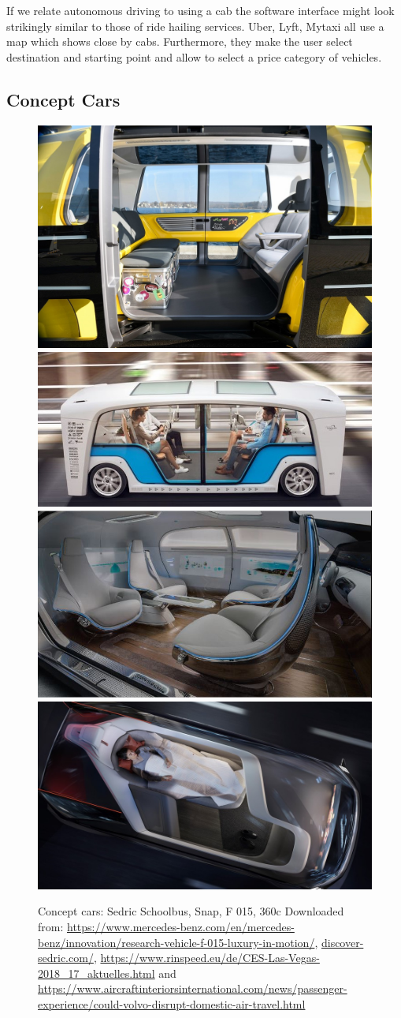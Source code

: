 If we relate autonomous driving to using a cab the software interface might look strikingly similar to those of ride hailing services. Uber, Lyft, Mytaxi all use a map which shows close by cabs. Furthermore, they make the user select destination and starting point and allow to select a price category of vehicles.  

\subsection{Concept Cars}
\label{sec:conceptcars}
\begin{figure}
    \includegraphics[height=0.27\textwidth]{fig/school_bus_Mittel.jpg}\hfill\includegraphics[height=0.27\textwidth]{fig/snap.jpg}\newline\includegraphics[height=0.276\textwidth]{fig/mercedes.JPG}\hfill\includegraphics[height=0.276\textwidth]{fig/360c_Mittel.jpg}
    \caption[Concept Cars]{Concept cars: Sedric Schoolbus, Snap, F 015, 360c Downloaded from: \url{https://www.mercedes-benz.com/en/mercedes-benz/innovation/research-vehicle-f-015-luxury-in-motion/}, \url{discover-sedric.com/}, \url{https://www.rinspeed.eu/de/CES-Las-Vegas-2018_17_aktuelles.html} and \url{https://www.aircraftinteriorsinternational.com/news/passenger-experience/could-volvo-disrupt-domestic-air-travel.html}}
    \label{fig:conceptcars}
\end{figure}
